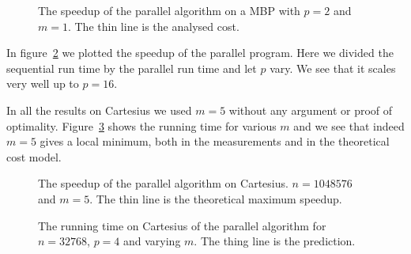 \begin{figure}
	\centering
	\caption{The speedup of the parallel algorithm on a MBP with $p = 2$ and $m = 1$. The thin line is the analysed cost.}
	\label{fig:speedup}
\end{figure}

In figure~\ref{fig:speedup} we plotted the speedup of the parallel program. Here we divided the sequential run time by the parallel run time and let $p$ vary. We see that it scales very well up to $p = 16$.

In all the results on Cartesius we used $m=5$ without any argument or proof of optimality. Figure~\ref{fig:optm} shows the running time for various $m$ and we see that indeed $m=5$ gives a local minimum, both in the measurements and in the theoretical cost model.

\begin{figure}
	\centering
	\caption{The speedup of the parallel algorithm on Cartesius. $n = 1048576$ and $m = 5$. The thin line is the theoretical maximum speedup.}
	\label{fig:speedup}
\end{figure}

\begin{figure}
	\centering
	\caption{The running time on Cartesius of the parallel algorithm for $n = 32768$, $p = 4$ and varying $m$. The thing line is the prediction.}
	\label{fig:optm}
\end{figure}
